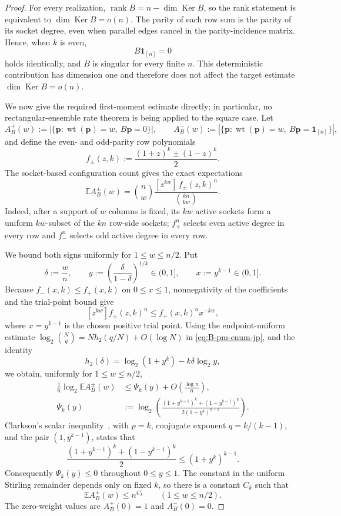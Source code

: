 \documentclass[11pt]{article}
\theoremstyle{definition}
\newcommand{\EE}{\mathbb E}
\newcommand{\rank}{\operatorname{rank}}
\newcommand{\wt}{\operatorname{wt}}
\newcommand{\Ker}{\operatorname{Ker}}
\newcommand{\bp}{\mathbf p}
\newcommand{\ones}{\mathbf 1}
\newcommand{\h}{h_2}
\begin{document}
\begin{proof}
For every realization, \(\rank B=n-\dim\Ker B\), so the rank statement is
equivalent to \(\dim\Ker B=o(n)\). The parity of each row sum is the parity of its
socket degree, even when parallel edges cancel in the parity-incidence matrix. Hence,
when \(k\) is even,
\begin{equation*}
B\ones_{[n]}=0
\end{equation*}
holds identically, and \(B\) is singular for every finite \(n\).
This deterministic contribution has dimension one and therefore does not affect
the target estimate \(\dim\Ker B=o(n)\).

We now give the required first-moment estimate directly; in particular, no
rectangular-ensemble rate theorem is being applied to the square case. Let
\[
A_B^+(w):=|\{\bp:\wt(\bp)=w,\ B\bp=0\}|,
\qquad
A_B^-(w):=|\{\bp:\wt(\bp)=w,\ B\bp=\ones_{[n]}\}|,
\]
and define the even- and odd-parity row polynomials
\[
f_\pm(z,k):=\frac{(1+z)^k\pm(1-z)^k}{2}.
\]
The socket-based configuration count gives the exact expectations
\begin{equation}\label{eq:B-pm-enum-jp}
\EE A_B^\pm(w)
=
\binom{n}{w}
\frac{[z^{kw}]\,f_\pm(z,k)^n}{\binom{kn}{kw}}.
\end{equation}
Indeed, after a support of \(w\) columns is fixed, its \(kw\) active sockets form
a uniform \(kw\)-subset of the \(kn\) row-side sockets; \(f_+^n\) selects even
active degree in every row and \(f_-^n\) selects odd active degree in every row.

We bound both signs uniformly for \(1\le w\le n/2\). Put
\[
\delta:=\frac wn,
\qquad
y:=\left(\frac{\delta}{1-\delta}\right)^{1/k}\in(0,1],
\qquad
x:=y^{k-1}\in(0,1].
\]
Because \(f_-(x,k)\le f_+(x,k)\) on \(0\le x\le1\), nonnegativity of the
coefficients and the trial-point bound give
\[
[z^{kw}]f_\pm(z,k)^n
\le f_+(x,k)^n x^{-kw},
\]
where \(x=y^{k-1}\) is the chosen positive trial point. Using the endpoint-uniform estimate
\(\log_2\binom{N}{q}=N\h(q/N)+O(\log N)\) in
\eqref{eq:B-pm-enum-jp}, and the identity
\[
\h(\delta)=\log_2(1+y^k)-k\delta\log_2 y,
\]
we obtain, uniformly for \(1\le w\le n/2\),
\begin{align*}
\frac1n\log_2\EE A_B^\pm(w)
&\le
\Psi_k(y)+O\!\left(\frac{\log n}{n}\right),\\
\Psi_k(y)
&:=
\log_2\!\left(
\frac{(1+y^{k-1})^k+(1-y^{k-1})^k}
{2(1+y^k)^{k-1}}
\right).
\end{align*}
Clarkson's scalar inequality~\cite{Clark36}, with \(p=k\), conjugate exponent
\(q=k/(k-1)\), and the pair \((1,y^{k-1})\), states that
\[
\frac{(1+y^{k-1})^k+(1-y^{k-1})^k}{2}
\le
\left(1+y^k\right)^{k-1}.
\]
Consequently \(\Psi_k(y)\le0\) throughout \(0\le y\le1\). The constant in the
uniform Stirling remainder depends only on fixed \(k\), so there is a constant
\(C_k\) such that
\begin{equation}\label{eq:B-pm-poly-jp}
\EE A_B^\pm(w)\le n^{C_k}
\qquad(1\le w\le n/2).
\end{equation}
The zero-weight values are \(A_B^+(0)=1\) and \(A_B^-(0)=0\).


\end{proof}
\end{document}
